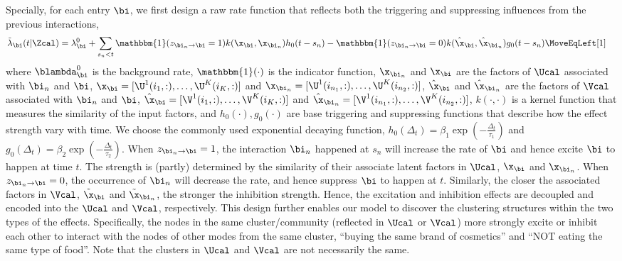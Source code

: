 Specially, for each entry $\bi$, we first design a raw rate function that reflects both the triggering and suppressing influences from the previous interactions, 
\begin{align}
\tilde{\lambda}_\bi(t|\Zcal) = \lambda_\bi^0 + \sum_{s_n<t} \mathbbm{1}(z_{\bi_n\rightarrow \bi} = 1) k(\x_{\bi}, \x_{\bi_n}) h_0(t - s_n) - \mathbbm{1}(z_{\bi_n\rightarrow \bi} = 0) k(\hat{\x}_{\bi}, \hat{\x}_{\bi_n})g_0(t-s_n)\MoveEqLeft[1]\hspace{11pt}\raisetag{1.6\baselineskip}\label{eq:raw}%
\end{align}
where $\blambda_\bi^0$ is the background rate, $\mathbbm{1}(\cdot)$ is the indicator function, $\x_{\bi_n}$ and $\x_{\bi}$ are the  factors of $\Ucal$ associated with  $\bi_n$ and $\bi$, $\x_{\bi} = [\U^1(i_1, :), \ldots, \U^K(i_K,:)]$ and $\x_{\bi_n} = [\U^1(i_{n_1}, :), \ldots, \U^K(i_{n_2},:)]$, 
 $\hat{\x}_{\bi}$ and $\hat{\x}_{\bi_n}$ are the factors of $\Vcal$ associated with $\bi_n$ and $\bi$, $\hat{\x}_{\bi} = [\V^1(i_1, :), \ldots, \V^K(i_K,:)]$ and $\hat{\x}_{\bi_n} = [\V^1(i_{n_1}, :), \ldots, \V^K(i_{n_2},:)]$,  $k(\cdot, \cdot)$ is a kernel function that measures the similarity of the input factors, and $h_0(\cdot), g_0(\cdot)$ are base triggering and suppressing functions that describe how the effect strength vary with time. We choose the commonly used exponential decaying function, $h_0(\Delta_t) = \beta_1\exp(-\frac{\Delta_t}{\tau_1})$ and $g_0(\Delta_t) = \beta_2\exp(-\frac{\Delta_t}{\tau_2})$.
 When $z_{\bi_n \rightarrow \bi} = 1$, the interaction $\bi_n$ happened at $s_n$ will increase the rate of $\bi$ and hence excite $\bi$ to happen at time $t$. The  strength is (partly) determined by the similarity of their associate latent factors in $\Ucal$, \ie $\x_{\bi}$ and $\x_{\bi_n}$.  When $z_{\bi_n \rightarrow \bi} = 0$, the occurrence of $\bi_n$ will decrease the rate, and hence suppress $\bi$ to happen at $t$. Similarly, the closer the associated factors in $\Vcal$, \ie $\tilde{\x}_{\bi}$ and $\tilde{\x}_{\bi_n}$, the stronger the inhibition strength. Hence, the excitation and inhibition effects are decoupled and encoded into the $\Ucal$ and $\Vcal$, respectively. This design further enables our model to discover the clustering structures within the two types of the effects. Specifically, the nodes in the same cluster/community (reflected in $\Ucal$ or $\Vcal$)  more strongly excite or inhibit each other to interact with the nodes of other modes from the same cluster, \eg ``buying the same brand of cosmetics'' and ``NOT eating the same type of food''. Note that the clusters in $\Ucal$ and $\Vcal$ are not necessarily the same. 


